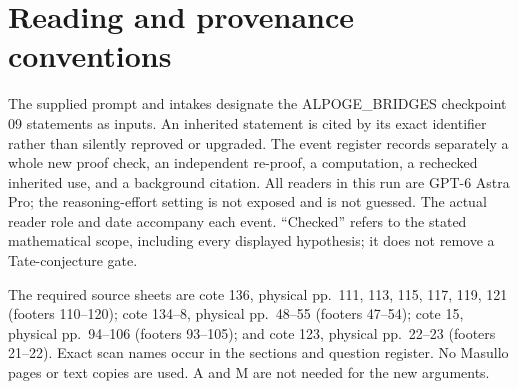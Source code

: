 \documentclass[11pt,a4paper]{article}
\begin{document}
\begin{abstract}
their critical prescribed endpoints cannot retain a suitable admissible
intermediate. A finite-skeleton replacement theorem validates a
replacement once the required truncated theory has been constructed.
The degree-four linking obstruction can be repaired on the two-truncated
category, but the repeated low-degree repairs needed to construct that
truncated theory remain open.
The complete low-degree filtration and explicit mixed residue formula
now show why the weaker graph invariant is not preserved. One fixed
source diagram has no admissible intermediate retaining its maps.
A relative free construction upgrades it to a partial source satisfying
every admissibility condition except the degree-two tail. These are
failures of prescribed choices; their identical admissible targets
still possess another common source.
The full tensor and interval hypotheses in cote
134--8 do not force higher coproduct surjectivity; the explicit example
nevertheless has the predicted localization. The motive sections give
geometric Chow constructions, exact mixed Tate criteria, a published-only
ordinary target, and a complete Honda--Tate check. The letter companion
includes a complete verification of the type-A normal form and a
finite orbit count. No result conditional on an outside preprint is
presented as unconditional.
\end{abstract}
\tableofcontents
\clearpage
\section*{Reading and provenance conventions}
The supplied prompt and intakes designate the ALPOGE\_BRIDGES checkpoint
09 statements as inputs. An inherited statement is cited by its exact
identifier rather than silently reproved or upgraded. The event register
records separately a whole new proof check, an independent re-proof, a
computation, a rechecked inherited use, and a background citation. All
readers in this run are GPT-6 Astra Pro; the reasoning-effort setting is
not exposed and is not guessed. The actual reader role and date accompany
each event. ``Checked'' refers to the stated mathematical scope, including
every displayed hypothesis; it does not remove a Tate-conjecture gate.

The required source sheets are cote 136, physical pp.~111, 113, 115,
117, 119, 121 (footers 110--120); cote 134--8, physical pp.~48--55
(footers 47--54); cote 15, physical pp.~94--106 (footers 93--105);
and cote 123, physical pp.~22--23 (footers 21--22). Exact scan names
occur in the sections and question register. No Masullo pages or text
copies are used. A and M are not needed for the new arguments.
\end{document}
